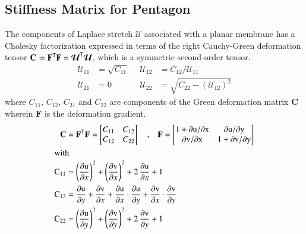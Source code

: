 \subsection{Stiffness Matrix for Pentagon}
The components of Laplace stretch $\boldsymbol{\mathcal{U}}$ associated with a planar membrane has a  Cholesky factorization expressed in terms of the right Cauchy-Green deformation tensor $\mathbf{C} \defeq \mathbf{F}^{\mathsf{T}} \mathbf{F} = \boldsymbol{\mathcal{U}}^{\mathsf{T}} \boldsymbol{\mathcal{U}}$, which is a symmetric second-order tensor. 
\begin{equation}
\begin{aligned}
{\mathcal{U}}_{11} & = \sqrt{C_{11}} \;\; & 
{\mathcal{U}}_{12} & = C_{12} / {\mathcal{U}_{11}} \\
{\mathcal{U}}_{21} & = 0 &
{\mathcal{U}}_{22} & = \sqrt{C_{22} - ({\mathcal{U}}_{12})^2} 
\end{aligned}
\label{Laplace stretchComponents}
\end{equation} 
where ${C_{11}}$, ${C_{12}}$, ${C_{21}}$ and ${C_{22}}$ are components of the Green deformation matrix $\mathbf{C}$ wherein  $\mathbf{F}$ is the deformation gradient.
\begin{subequations}
	\begin{align}
	\mathbf{C} &= \mathbf{F}^{\mathsf{T}} \mathbf{F} =
	\begin{bmatrix}
	C_{11} & C_{12}  \\
	C_{12} & C_{22} 
	\end{bmatrix} \quad \textrm{,} \quad
	\mathbf{F} =  
	\begin{bmatrix}
	1+\mathrm{\partial u / \partial x} & \mathrm{\partial u / \partial y}  \\
	\mathrm{\partial v / \partial x} & 1+\mathrm{\partial v / \partial y}
	\end{bmatrix}\\
	\intertext{with}
	\mathrm{C_{11}}&= \left(\frac{\mathrm{\partial u}}{\partial x}\right)^2+ \left(\frac{\mathrm{\partial v}}{\partial x}\right)^2 + 2\, \frac{\mathrm{\partial u}}{\partial x}  + 1\\
	\mathrm{C_{12}}&= \frac{\mathrm{\partial u}}{\partial y} + \frac{\mathrm{\partial v}}{\partial x} + \frac{\mathrm{\partial u}}{\partial x} \cdot \frac{\mathrm{\partial u}}{\partial y} + \frac{\mathrm{\partial v}}{\partial x} \cdot \frac{\mathrm{\partial v}}{\partial y}\\
	\mathrm{C_{22}}&= \left(\frac{\mathrm{\partial u}}{\partial y}\right)^2 + \left(\frac{\mathrm{\partial v}}{\partial y}\right)^2 + 2\, \frac{\mathrm{\partial v}}{\partial y} + 1
	\end{align}
\end{subequations}
